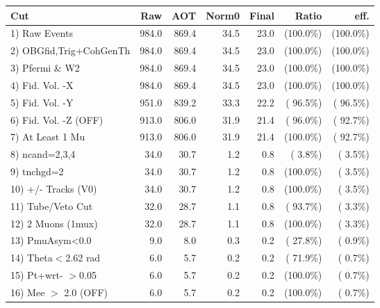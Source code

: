  \begin{table}[h!]\centering
 \begin{tabular}{||l||r|r|r|r|r|r||}
 \hline
 \hline
 Cut & Raw & AOT & Norm0 & Final & Ratio & eff.       \\
 \hline
  1) Raw Events           &        984.0 &        869.4 &         34.5 &         23.0 & (100.0\%) & (100.0\%) \\
  2) OBGfid,Trig+CohGenTh &        984.0 &        869.4 &         34.5 &         23.0 & (100.0\%) & (100.0\%) \\
  3) Pfermi \& W2         &        984.0 &        869.4 &         34.5 &         23.0 & (100.0\%) & (100.0\%) \\
  4) Fid. Vol. -X         &        984.0 &        869.4 &         34.5 &         23.0 & (100.0\%) & (100.0\%) \\
  5) Fid. Vol. -Y         &        951.0 &        839.2 &         33.3 &         22.2 & ( 96.5\%) & ( 96.5\%) \\
  6) Fid. Vol. -Z (OFF)   &        913.0 &        806.0 &         31.9 &         21.4 & ( 96.0\%) & ( 92.7\%) \\
  7) At Least 1 Mu        &        913.0 &        806.0 &         31.9 &         21.4 & (100.0\%) & ( 92.7\%) \\
  8) ncand=2,3,4          &         34.0 &         30.7 &          1.2 &          0.8 & (  3.8\%) & (  3.5\%) \\
  9) tnchgd=2             &         34.0 &         30.7 &          1.2 &          0.8 & (100.0\%) & (  3.5\%) \\
 10) +/- Tracks (V0)      &         34.0 &         30.7 &          1.2 &          0.8 & (100.0\%) & (  3.5\%) \\
 11) Tube/Veto Cut        &         32.0 &         28.7 &          1.1 &          0.8 & ( 93.7\%) & (  3.3\%) \\
 12) 2 Muons (1mux)       &         32.0 &         28.7 &          1.1 &          0.8 & (100.0\%) & (  3.3\%) \\
 13) PmuAsym<0.0          &          9.0 &          8.0 &          0.3 &          0.2 & ( 27.8\%) & (  0.9\%) \\
 14) Theta$<$2.62 rad     &          6.0 &          5.7 &          0.2 &          0.2 & ( 71.9\%) & (  0.7\%) \\
 15) Pt+wrt- $>$0.05      &          6.0 &          5.7 &          0.2 &          0.2 & (100.0\%) & (  0.7\%) \\
 16) Mee $>$ 2.0  (OFF)   &          6.0 &          5.7 &          0.2 &          0.2 & (100.0\%) & (  0.7\%) \\

\end{tabular}
\end{table}
